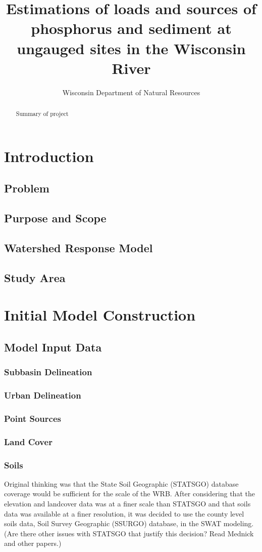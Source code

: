 \documentclass[10pt,letterpaper]{article}%
\author{Wisconsin Department of Natural Resources}
\title{Estimations of loads and sources of phosphorus and sediment at ungauged sites in the Wisconsin River}
\begin{document}
\maketitle
\pagebreak
\tableofcontents
\pagebreak
\listoffigures
\pagebreak
\listoftables
\pagebreak
\begin{abstract}
Summary of project
\end{abstract}
\pagebreak
\section{Introduction}
	\subsection{Problem}
	\subsection{Purpose and Scope}
	\subsection{Watershed Response Model}
	\subsection{Study Area}
\pagebreak
\section{Initial Model Construction}
	\subsection{Model Input Data}
		\subsubsection{Subbasin Delineation}
		\subsubsection{Urban Delineation}
		\subsubsection{Point Sources}
		\subsubsection{Land Cover}
		\subsubsection{Soils}
		Original thinking was that the State Soil Geographic (STATSGO) database coverage would be sufficient for the scale of the WRB. After considering that the elevation and landcover data was at a finer scale than STATSGO and that soils data was available at a finer resolution, it was decided to use the county level soils data, Soil Survey Geographic (SSURGO) database, in the SWAT modeling. (Are there other issues with STATSGO that justify this decision? Read Mednick and other papers.)  		
		
\end{document}
